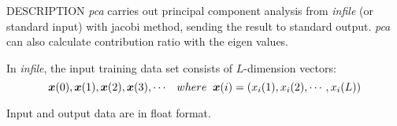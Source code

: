 % 
% 
% 
% 
%                                                                        
%
\def\Vec#1{\mbox{\boldmath $#1$}}

\begin{synopsis}
 \item[pca] [ --l $L$ ] [ --n $N$] [ --i $I$] [ --e $e$]
 [ --v ]  [ --V $fn$ ] [ {\em infile} ] 
\end{synopsis}

\begin{qsection}{DESCRIPTION}
 {\em pca} carries out principal component analysis
 from {\em infile} (or standard input) with jacobi method,
 sending the result to standard output.
 {\em pca} can also calculate contribution ratio with the eigen values.

 In {\em infile},
 the input training data set consists of $L$-dimension vectors:
 \[
 \Vec{x}(0), \Vec{x}(1), \Vec{x}(2), \Vec{x}(3), \cdots \;\;\;
 where\;\;\Vec{x}(i) = (x_{i}(1), x_{i}(2), \cdots, x_{i}(L))
 \]

Input and output data are in float format. 
\end{qsection}

